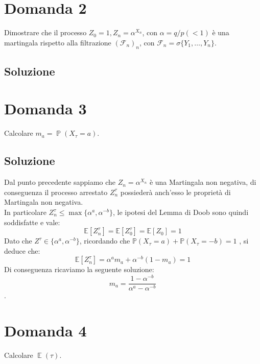 \documentclass[
	12pt, %
]{fphw}
\DeclareMathOperator{\Ev}{\mathbb{E}}%
\DeclareMathOperator{\Pro}{\mathbb{P}}%
\begin{document}
\section*{Domanda 2}
\begin{problem}
	Dimostrare che il processo $Z_0 = 1, Z_n = \alpha^{X_n}$, con $\alpha = q/p(< 1)$ è una martingala
	rispetto alla filtrazione $(\mathcal{F}_n)_n$, con $\mathcal{F}_n = \sigma\{Y_1, \dots , Y_n\}$.
	\smallskip
\end{problem}

\subsection*{Soluzione}



\section*{Domanda 3}
\begin{problem}
	Calcolare $m_a = \Pro(X_{\tau} = a)$.
	\smallskip
\end{problem}

\subsection*{Soluzione}
Dal punto precedente sappiamo che $Z_n = \alpha^{X_n}$ è una Martingala non negativa, di conseguenza il processo arrestato $Z_n^{\tau}$ possiederà anch'esso le proprietà di Martingala non negativa.\\
In particolare $Z_n^{\tau} \leq \max \{\alpha^a, \alpha^{-b}\}$, le ipotesi del Lemma di Doob sono quindi soddisfatte e vale:
\begin{equation*}
\mathbb{E}[Z_n^{\tau}] = \mathbb{E}[Z_0^{\tau}]  = \mathbb{E}[Z_0] = 1
\end{equation*}
Dato che $Z^{\tau} \in \{ \alpha^a, \alpha^{-b} \}$, ricordando che $\mathbb{P}(X_{\tau} = a) + \mathbb{P}(X_{\tau} = -b) = 1$ , si deduce che:
\begin{equation*}
\mathbb{E}[Z_n^{\tau}] = \alpha^a m_a + \alpha^{-b} (1-m_a) = 1
\end{equation*}
Di conseguenza ricaviamo la seguente soluzione:
\begin{equation*}
m_a = \frac{1-\alpha^{-b}}{\alpha^a-\alpha^{-b}}
\end{equation*}.

\section*{Domanda 4}
\begin{problem}
	Calcolare $\Ev(\tau)$.
	\smallskip
\end{problem}
\end{document}
